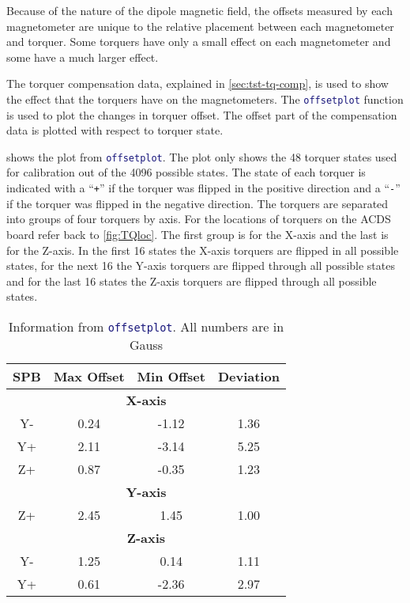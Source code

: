 Because of the nature of the dipole magnetic field, the offsets measured by each magnetometer are unique to the relative placement between each magnetometer and torquer. Some torquers have only a small effect on each magnetometer and some have a much larger effect. 

The torquer compensation data, explained in \cref{sec:tst-tq-comp}, is used to show the effect that the torquers have on the magnetometers. The \lstinline[style=code,language=Matlab]$offsetplot$ function is used to plot the changes in torquer offset. The offset part of the compensation data is plotted with respect to torquer state.

 shows the plot from \lstinline[style=code,language=Matlab]$offsetplot$. The plot only shows the 48 torquer states used for calibration out of the 4096 possible states. The state of each torquer is indicated with a \enquote{\texttt{+}} if the torquer was flipped in the positive direction and a \enquote{\texttt{-}} if the torquer was flipped in the negative direction. The torquers are separated into groups of four torquers by axis. For the locations of torquers on the \ac{ACDS} board refer back to \cref{fig:TQloc}. The first group is for the X-axis and the last is for the Z-axis. In the first 16 states the X-axis torquers are flipped in all possible states, for the next 16 the Y-axis torquers are flipped through all possible states and for the last 16 states the Z-axis torquers are flipped through all possible states.

 
\begin{table}[!ht]
    \centering
    \caption{Information from \lstinline[style=code,language=Matlab]$offsetplot$. All numbers are in Gauss}
    \label{tab:off-stat}
    \begin{tabular}{|c|c|c|c|}
        \hline
        \acs{SPB}&Max Offset&Min Offset&Deviation\\
        \hline
        \multicolumn{4}{|c|}{\bfseries X-axis}\\
        \hline
        Y-&0.24&-1.12&1.36\\
        \hline
        Y+&2.11&-3.14&5.25\\
        \hline
        Z+&0.87&-0.35&1.23\\
        \hline
        \multicolumn{4}{|c|}{\bfseries Y-axis}\\
        \hline
        Z+&2.45&1.45&1.00\\
        \hline
        \multicolumn{4}{|c|}{\bfseries Z-axis}\\
        \hline
        Y-&1.25&0.14&1.11\\
        \hline
        Y+&0.61&-2.36&2.97\\
        \hline
    \end{tabular}
\end{table}


